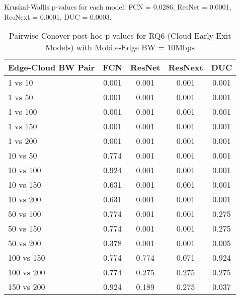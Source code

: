 \begin{table}[h]
\centering
\caption{Pairwise Conover post-hoc p-values for RQ6 (Cloud Early Exit Models) with Mobile-Edge BW = 10Mbps}
\label{tab:conover_cloud_earlyexit_me10}
\smallskip
Kruskal-Wallis p-values for each model: FCN = 0.0286, ResNet = 0.0001, ResNext = 0.0001, DUC = 0.0003.

\begin{tabular}{lcccc}
\toprule
Edge-Cloud BW Pair & FCN & ResNet & ResNext & DUC \\
\midrule
1 vs 10 & 0.001 & 0.001 & 0.001 & 0.001 \\
1 vs 50 & 0.001 & 0.001 & 0.001 & 0.001 \\
1 vs 100 & 0.001 & 0.001 & 0.001 & 0.001 \\
1 vs 150 & 0.001 & 0.001 & 0.001 & 0.001 \\
1 vs 200 & 0.001 & 0.001 & 0.001 & 0.001 \\
10 vs 50 & 0.774 & 0.001 & 0.001 & 0.001 \\
10 vs 100 & 0.924 & 0.001 & 0.001 & 0.001 \\
10 vs 150 & 0.631 & 0.001 & 0.001 & 0.001 \\
10 vs 200 & 0.631 & 0.001 & 0.001 & 0.001 \\
50 vs 100 & 0.774 & 0.001 & 0.001 & 0.275 \\
50 vs 150 & 0.774 & 0.001 & 0.001 & 0.275 \\
50 vs 200 & 0.378 & 0.001 & 0.001 & 0.005 \\
100 vs 150 & 0.774 & 0.774 & 0.071 & 0.924 \\
100 vs 200 & 0.774 & 0.275 & 0.275 & 0.275 \\
150 vs 200 & 0.924 & 0.189 & 0.275 & 0.037 \\
\bottomrule
\end{tabular}
\end{table}

